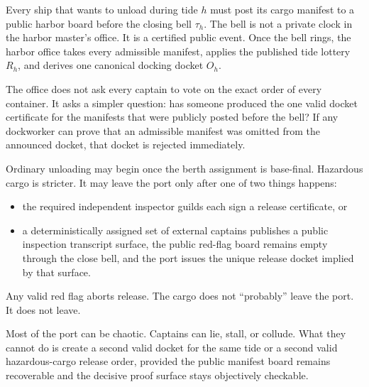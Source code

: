 \documentclass[11pt]{article}
\begin{document}
Every ship that wants to unload during tide \(h\) must post its cargo manifest
to a public harbor board before the closing bell \(\tau_h\). The bell is not a
private clock in the harbor master's office. It is a certified public event.
Once the bell rings, the harbor office takes every admissible manifest,
applies the published tide lottery \(R_h\), and derives one canonical docking
docket \(O_h\).

The office does not ask every captain to vote on the exact order of every
container. It asks a simpler question: has someone produced the one valid
docket certificate for the manifests that were publicly posted before the bell?
If any dockworker can prove that an admissible manifest was omitted from the
announced docket, that docket is rejected immediately.

Ordinary unloading may begin once the berth assignment is base-final.
Hazardous cargo is stricter. It may leave the port only after one of two
things happens:

\begin{itemize}[leftmargin=1.5em]
\item the required independent inspector guilds each sign a release
certificate, or
\item a deterministically assigned set of external captains publishes a public
inspection transcript surface, the public red-flag board remains empty through
the close bell, and the port issues the unique release docket implied by that
surface.
\end{itemize}

Any valid red flag aborts release. The cargo does not ``probably'' leave the
port. It does not leave.

Most of the port can be chaotic. Captains can lie, stall, or collude. What
they cannot do is create a second valid docket for the same tide or a second
valid hazardous-cargo release order, provided the public manifest board
remains recoverable and the decisive proof surface stays objectively
checkable.
\end{document}

